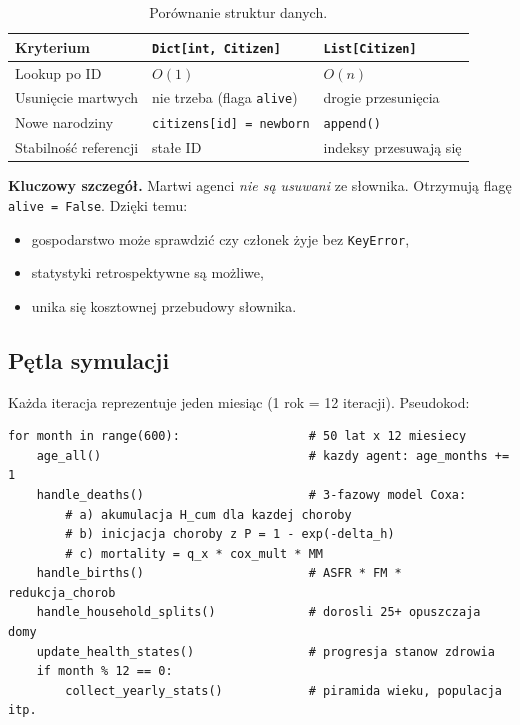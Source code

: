 \documentclass[11pt,a4paper]{article}
\begin{document}
\begin{table}[h]
\centering
\small
\begin{tabular}{lll}
\toprule
\textbf{Kryterium} & \texttt{Dict[int, Citizen]} & \texttt{List[Citizen]} \\
\midrule
Lookup po ID                & $O(1)$           & $O(n)$ \\
Usunięcie martwych          & nie trzeba (flaga \texttt{alive}) & drogie przesunięcia \\
Nowe narodziny              & \texttt{citizens[id] = newborn} & \texttt{append()} \\
Stabilność referencji       & stałe ID         & indeksy przesuwają się \\
\bottomrule
\end{tabular}
\caption{Porównanie struktur danych.}
\end{table}

\textbf{Kluczowy szczegół.} Martwi agenci \emph{nie są usuwani} ze słownika. Otrzymują flagę \texttt{alive = False}. Dzięki temu:
\begin{itemize}
  \item gospodarstwo może sprawdzić czy członek żyje bez \texttt{KeyError},
  \item statystyki retrospektywne są możliwe,
  \item unika się kosztownej przebudowy słownika.
\end{itemize}

\subsection{Pętla symulacji}

Każda iteracja reprezentuje jeden miesiąc (1 rok = 12 iteracji). Pseudokod:

\begin{lstlisting}
for month in range(600):                  # 50 lat x 12 miesiecy
    age_all()                             # kazdy agent: age_months += 1
    handle_deaths()                       # 3-fazowy model Coxa:
        # a) akumulacja H_cum dla kazdej choroby
        # b) inicjacja choroby z P = 1 - exp(-delta_h)
        # c) mortality = q_x * cox_mult * MM
    handle_births()                       # ASFR * FM * redukcja_chorob
    handle_household_splits()             # dorosli 25+ opuszczaja domy
    update_health_states()                # progresja stanow zdrowia
    if month % 12 == 0:
        collect_yearly_stats()            # piramida wieku, populacja itp.
\end{lstlisting}
\end{document}
